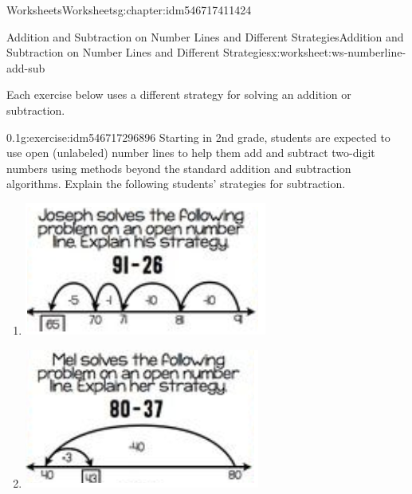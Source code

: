 \documentclass[twoside,11pt,]{book}
\begin{document}
\begin{chapterptx}{Worksheets}{}{Worksheets}{}{}{g:chapter:idm546717411424}
\begin{worksheet-section-numberless}{Addition and Subtraction on Number Lines and Different Strategies}{}{Addition and Subtraction on Number Lines and Different Strategies}{}{}{x:worksheet:ws-numberline-add-sub}
\begin{introduction}{}
Each exercise below uses a different strategy for solving an addition or subtraction.%
\end{introduction}%
\begin{divisionexercise}{1}{}{0.1}{g:exercise:idm546717296896}%
Starting in 2nd grade, students are expected to use open (unlabeled) number lines to help them add and subtract two-digit numbers using methods beyond the standard addition and subtraction algorithms.   Explain the following students’ strategies for subtraction.%
%
\begin{enumerate}[label=(\alph*)]
\item{} \begin{image}{0}{1}{0}%
\includegraphics[width=1\linewidth]{images/numberline-add-sub-1a.png}
\end{image}%
\item{} \begin{image}{0}{1}{0}%
\includegraphics[width=1\linewidth]{images/numberline-add-sub-1b.png}
\end{image}%
\end{enumerate}
\end{divisionexercise}%

\end{worksheet-section-numberless}
\end{chapterptx}
\end{document}
